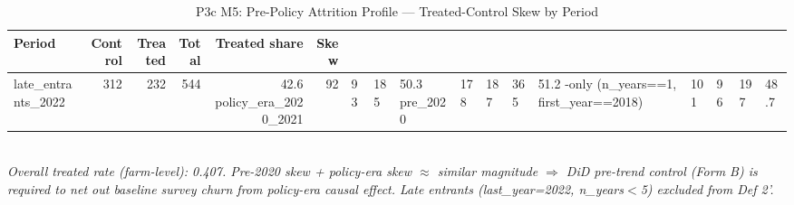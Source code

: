 \begin{table}[t]
\centering
\caption{P3c M5: Pre-Policy Attrition Profile — Treated-Control Skew by Period}
\label{tab:ch5_attrition_profile_en}
\begin{tabular}{lrrrrr}
\toprule
Period & Control & Treated & Total & Treated share & Skew \\
\midrule
late_entrants_2022 & 312 & 232 & 544 & 42.6%
policy_era_2020_2021 & 92 & 93 & 185 & 50.3%
pre_2020 & 178 & 187 & 365 & 51.2%
-only (n\_years==1, first\_year==2018) & 101 & 96 & 197 & 48.7%
\bottomrule
\end{tabular}\\
\footnotesize\textit{Overall treated rate (farm-level): 0.407. Pre-2020 skew + policy-era skew $\approx$ similar magnitude $\Rightarrow$ DiD pre-trend control (Form B) is required to net out baseline survey churn from policy-era causal effect. Late entrants (last\_year=2022, n\_years$<$5) excluded from Def 2'.}
\end{table}

